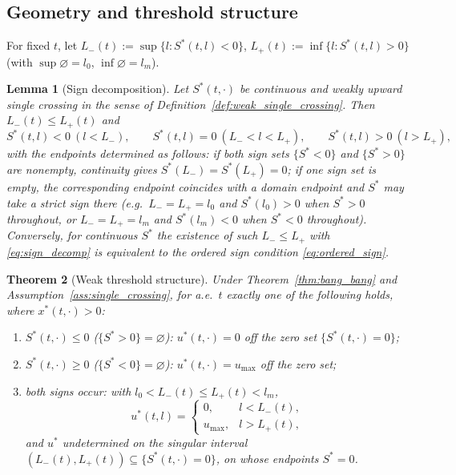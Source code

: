 \documentclass[pdflatex,sn-mathphys-num]{sn-jnl}
\theoremstyle{plain}
\newtheorem{theorem}{Theorem}[section]
\newtheorem{lemma}[theorem]{Lemma}
\theoremstyle{definition}
\theoremstyle{remark}
\begin{document}
\subsection{Geometry and threshold structure}
\label{subsec:single_crossing_geometry}

For fixed $t$, let $L_-(t):=\sup\{l:S^*(t,l)<0\}$, $L_+(t):=\inf\{l:S^*(t,l)>0\}$
(with $\sup\varnothing=l_0$, $\inf\varnothing=l_m$).

\begin{lemma}[Sign decomposition]
\label{lem:sign_decomposition}
Let $S^*(t,\cdot)$ be continuous and weakly upward single crossing in the sense of
Definition~\ref{def:weak_single_crossing}. Then $L_-(t)\le L_+(t)$ and
\begin{equation}\label{eq:sign_decomp}
S^*(t,l)<0\ (l<L_-),\qquad
S^*(t,l)=0\ (L_-<l<L_+),\qquad
S^*(t,l)>0\ (l>L_+),
\end{equation}
with the endpoints determined as follows: if both sign sets $\{S^*<0\}$ and
$\{S^*>0\}$ are nonempty, continuity gives $S^*(L_-)=S^*(L_+)=0$; if one sign set
is empty, the corresponding endpoint coincides with a domain endpoint and $S^*$
may take a strict sign there (e.g.\ $L_-=L_+=l_0$ and $S^*(l_0)>0$ when $S^*>0$
throughout, or $L_-=L_+=l_m$ and $S^*(l_m)<0$ when $S^*<0$ throughout). Conversely,
for continuous $S^*$ the existence of such $L_-\le L_+$ with \eqref{eq:sign_decomp}
is equivalent to the ordered sign condition \eqref{eq:ordered_sign}.
\end{lemma}

\begin{theorem}[Weak threshold structure]
\label{thm:weak_threshold_structure}
Under Theorem~\ref{thm:bang_bang} and Assumption~\ref{ass:single_crossing}, for
a.e.\ $t$ exactly one of the following holds, where $x^*(t,\cdot)>0$:
\begin{enumerate}[label=\textnormal{(\roman*)}]
\item $S^*(t,\cdot)\le0$ ($\{S^*>0\}=\varnothing$): $u^*(t,\cdot)=0$
off the zero set $\{S^*(t,\cdot)=0\}$;
\item $S^*(t,\cdot)\ge0$ ($\{S^*<0\}=\varnothing$):
$u^*(t,\cdot)=u_{\max}$ off the zero set;
\item both signs occur: with $l_0<L_-(t)\le L_+(t)<l_m$,
\[
u^*(t,l)=
\begin{cases}
0, & l<L_-(t),\\
u_{\max}, & l>L_+(t),
\end{cases}
\]
and $u^*$ undetermined on the singular interval
$(L_-(t),L_+(t))\subseteq\{S^*(t,\cdot)=0\}$, on whose endpoints $S^*=0$.
\end{enumerate}
\end{theorem}
\end{document}
